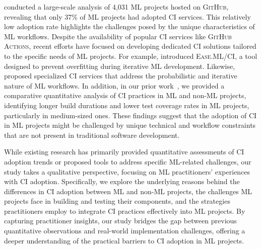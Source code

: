 \cite{rzig2022characterizing} conducted a large-scale analysis of 4,031 ML projects hosted on \textsc{GitHub}, revealing that only 37\% of ML projects had adopted CI services. This relatively low adoption rate highlights the challenges posed by the unique characteristics of ML workflows. Despite the availability of popular CI services like \textsc{GitHub Actions}, recent efforts have focused on developing dedicated CI solutions tailored to the specific needs of ML projects. For example, \cite{renggli2019continuous} introduced \textsc{Ease.ML/CI}, a tool designed to prevent overfitting during iterative ML development. Likewise, \cite{karlavs2020building} proposed specialized CI services that address the probabilistic and iterative nature of ML workflows.
In addition, in our prior work~\citep{bernardo2024machine}, we provided a comparative quantitative analysis of CI practices in ML and non-ML projects, identifying longer build durations and lower test coverage rates in ML projects, particularly in medium-sized ones. 
These findings suggest that the adoption of CI in ML projects might be challenged by unique technical and workflow constraints that are not present in traditional software development.

While existing research has primarily provided quantitative assessments of CI adoption trends or proposed tools to address specific ML-related challenges, our study takes a qualitative perspective, focusing on ML practitioners' experiences with CI adoption. Specifically, we explore the underlying reasons behind the differences in CI adoption between ML and non-ML projects, the challenges ML projects face in building and testing their components, and the strategies practitioners employ to integrate CI practices effectively into ML projects. By capturing practitioner insights, our study bridges the gap between previous quantitative observations and real-world implementation challenges, offering a deeper understanding of the practical barriers to CI adoption in ML projects.

